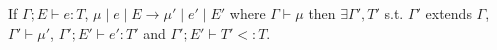 \documentclass{llncs}
\begin{document}
\begin{theorem}
If $\Gamma; E \vdash e : T$, 
   	$\mu \; | \; e \; | \; E \rightarrow \mu' \; | \; e' \; | \; E'$ where
	$\Gamma \vdash \mu$ then 
 	$\exists \Gamma', T'$ s.t. 
	$\Gamma'$ extends $\Gamma$, 
	$\Gamma' \vdash \mu'$, 
	$\Gamma'; E' \vdash e' : T'$ 
	and $\Gamma'; E' \vdash T'<:T$.
\end{theorem}
%
%
\end{document}
